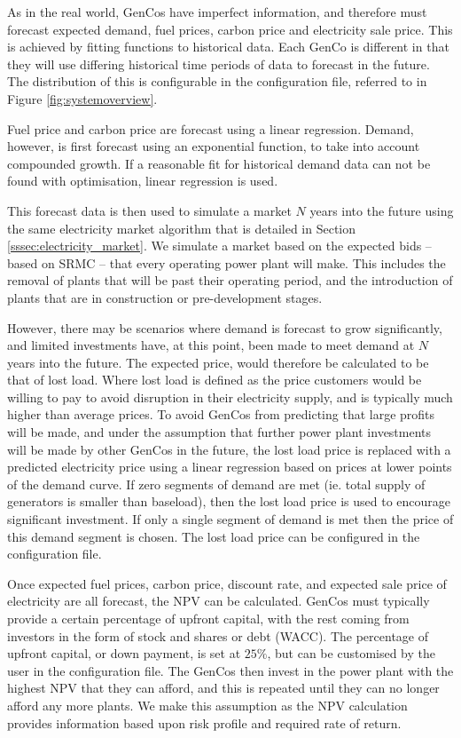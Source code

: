 As in the real world, GenCos have imperfect information, and therefore must forecast expected demand, fuel prices, carbon price and electricity sale price. This is achieved by fitting functions to historical data. Each GenCo is different in that they will use differing historical time periods of data to forecast in the future. The distribution of this is configurable in the configuration file, referred to in Figure \ref{fig:systemoverview}.

Fuel price and carbon price are forecast using a linear regression. Demand, however, is first forecast using an exponential function, to take into account compounded growth. If a reasonable fit for historical demand data can not be found with optimisation, linear regression is used.

This forecast data is then used to simulate a market $N$ years into the future using the same electricity market algorithm that is detailed in Section \ref{sssec:electricity_market}. We simulate a market based on the expected bids -- based on SRMC -- that every operating power plant will make. This includes the removal of plants that will be past their operating period, and the introduction of plants that are in construction or pre-development stages. 

However, there may be scenarios where demand is forecast to grow significantly, and limited investments have, at this point, been made to meet demand at $N$ years into the future. The expected price, would therefore be calculated to be that of lost load. Where lost load is defined as the price customers would be willing to pay to avoid disruption in their electricity supply, and is typically much higher than average prices. To avoid GenCos from predicting that large profits will be made, and under the assumption that further power plant investments will be made by other GenCos in the future, the lost load price is replaced with a predicted electricity price using a linear regression based on prices at lower points of the demand curve. If zero segments of demand are met (ie. total supply of generators is smaller than baseload), then the lost load price is used to encourage significant investment. If only a single segment of demand is met then the price of this demand segment is chosen. The lost load price can be configured in the configuration file.

Once expected fuel prices, carbon price, discount rate, and expected sale price of electricity are all forecast, the NPV can be calculated. GenCos must typically provide a certain percentage of upfront capital, with the rest coming from investors in the form of stock and shares or debt (WACC). The percentage of upfront capital, or down payment, is set at $25\%$, but can be customised by the user in the configuration file. The GenCos then invest in the power plant with the highest NPV that they can afford, and this is repeated until they can no longer afford any more plants. We make this assumption as the NPV calculation provides information based upon risk profile and required rate of return.

